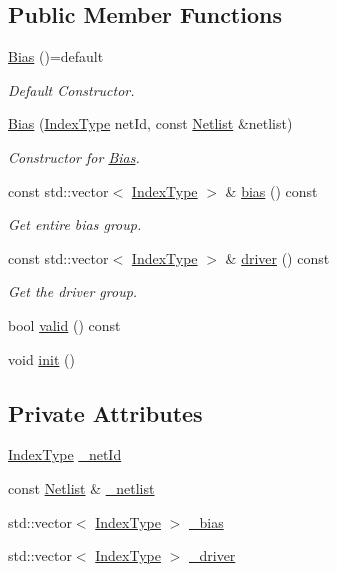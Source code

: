 \subsection*{Public Member Functions}
\begin{DoxyCompactItemize}
\item 
\hyperlink{classBias_a5e0a80d4549e61f0e5d8c9d00659ad4d}{Bias} ()=default
\begin{DoxyCompactList}\small\item\em Default Constructor. \end{DoxyCompactList}\item 
\hyperlink{classBias_a1373ea9210307ff6e856d705ca24cd1d}{Bias} (\hyperlink{type_8h_a581e8093e28e7362f2b6937296190676}{Index\+Type} net\+Id, const \hyperlink{classNetlist}{Netlist} \&netlist)
\begin{DoxyCompactList}\small\item\em Constructor for \hyperlink{classBias}{Bias}. \end{DoxyCompactList}\item 
const std\+::vector$<$ \hyperlink{type_8h_a581e8093e28e7362f2b6937296190676}{Index\+Type} $>$ \& \hyperlink{classBias_ae8bea9924068867c86a28fa01fe015dc}{bias} () const
\begin{DoxyCompactList}\small\item\em Get entire bias group. \end{DoxyCompactList}\item 
const std\+::vector$<$ \hyperlink{type_8h_a581e8093e28e7362f2b6937296190676}{Index\+Type} $>$ \& \hyperlink{classBias_a1ce69bcc1c78a3a06ba13a3bcb363fb5}{driver} () const
\begin{DoxyCompactList}\small\item\em Get the driver group. \end{DoxyCompactList}\item 
bool \hyperlink{classBias_ae917e3b0f32f52639db370bc49766328}{valid} () const
\item 
void \hyperlink{classBias_ab2453141710ffdb4644d6427c3edd34d}{init} ()
\end{DoxyCompactItemize}
\subsection*{Private Attributes}
\begin{DoxyCompactItemize}
\item 
\hyperlink{type_8h_a581e8093e28e7362f2b6937296190676}{Index\+Type} \hyperlink{classBias_a9fac526ba276c7593241f7ba439c0f31}{\+\_\+net\+Id}
\item 
const \hyperlink{classNetlist}{Netlist} \& \hyperlink{classBias_a80d38b13e72f5586c72013a91f6914a6}{\+\_\+netlist}
\item 
std\+::vector$<$ \hyperlink{type_8h_a581e8093e28e7362f2b6937296190676}{Index\+Type} $>$ \hyperlink{classBias_a8b24bf7291399bf389c9c73d585a02f2}{\+\_\+bias}
\item 
std\+::vector$<$ \hyperlink{type_8h_a581e8093e28e7362f2b6937296190676}{Index\+Type} $>$ \hyperlink{classBias_a51db005f686c23b55031be0e6daf3fdd}{\+\_\+driver}
\end{DoxyCompactItemize}


